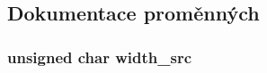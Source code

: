 \subsection{Dokumentace proměnných}
\subsubsection[{width\_\-src}]{\setlength{\rightskip}{0pt plus 5cm}unsigned char {\bf width\_\-src}}\label{usart__recv_8h_a438d690afcf99fcf144f660af7e2cddc}
